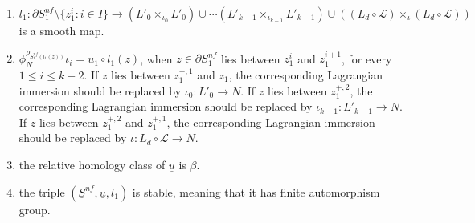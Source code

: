 \documentclass{amsart}
\numberwithin{equation}{section}
\numberwithin{figure}{section}
\begin{document}
\begin{enumerate}[label=(\roman*)]
\item $l_{1}: \partial S_{1}^{nf} \setminus \{z_{1}^{i}: i \in I\} \to (L'_{0} \times_{\iota_{0}} L'_{0}) \cup \cdots (L'_{k-1} \times_{\iota_{k-1}} L'_{k-1}) \cup ( (L_{d} \circ \mathcal{L}) \times_{\iota} (L_{d} \circ \mathcal{L}))$ is a smooth map.

\item $\phi_{N}^{\rho_{S^{nf}_{1}(l_{1}(z))}} \iota_{i} = u_{1} \circ l_{1}(z)$, when $z \in \partial S^{nf}_{1}$ lies between $z_{1}^{i}$ and $z_{1}^{i+1}$, for every $1 \le i \le k-2$. If $z$ lies between $z_{1}^{+, 1}$ and $z_{1}$, the corresponding Lagrangian immersion should be replaced by $\iota_{0}: L'_{0} \to N$. If $z$ lies between $z_{1}^{+, 2}$, the corresponding Lagrangian immersion should be replaced by $\iota_{k-1}: L'_{k-1} \to N$. If $z$ lies between $z_{1}^{+, 2}$ and $z_{1}^{+, 1}$, the corresponding Lagrangian immersion should be replaced by $\iota: L_{d} \circ \mathcal{L} \to N$.

\item the relative homology class of $\underline{u}$ is $\beta$.

\item the triple $(\underline{S}^{nf}, \underline{u}, l_{1})$ is stable, meaning that it has finite automorphism group.

\end{enumerate}
\end{document}
